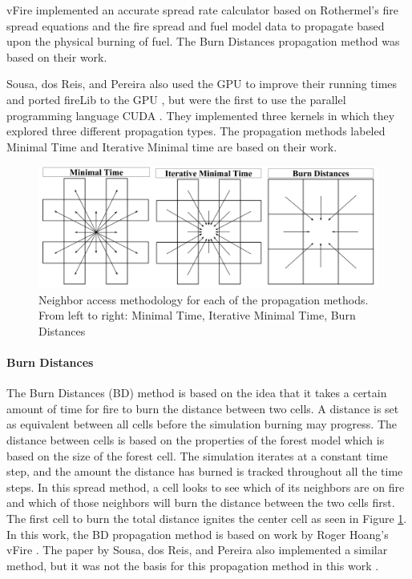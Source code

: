vFire implemented an accurate spread rate calculator based on Rothermel's fire spread equations and the fire spread and fuel model data to propagate based upon the physical burning of fuel. The Burn Distances propagation method was based on their work.

Sousa, dos Reis, and Pereira also used the GPU to improve their running times and ported fireLib to the GPU \cite{gpufire}, but were the first to use the parallel programming language CUDA \cite{cuda}. They implemented three kernels in which they explored three different propagation types. The propagation methods labeled Minimal Time and Iterative Minimal time are based on their work. 

\begin{figure}%
\centering
\includegraphics[width=\linewidth]{figures/background/spread_methods.PNG}
\caption{Neighbor access methodology for each of the propagation methods. From left to right: Minimal Time, Iterative Minimal Time, Burn Distances}
\label{fig:spreadTypes}
\end{figure}

\paragraph{Burn Distances}
The Burn Distances (BD) method is based on the idea that it takes a certain amount of time for fire to burn the distance between two cells. A distance is set as equivalent between all cells before the simulation burning may progress. The distance between cells is based on the properties of the forest model which is based on the size of the forest cell. The simulation iterates at a constant time step, and the amount the distance has burned is tracked throughout all the time steps. In this spread method, a cell looks to see which of its neighbors are on fire and which of those neighbors will burn the distance between the two cells first. The first cell to burn the total distance ignites the center cell as seen in Figure \ref{fig:spreadTypes}. In this work, the BD propagation method is based on work by Roger Hoang's vFire \cite{vFire}. The paper by Sousa, dos Reis, and Pereira also implemented a similar method, but it was not the basis for this propagation method in this work \cite{gpufire}.

